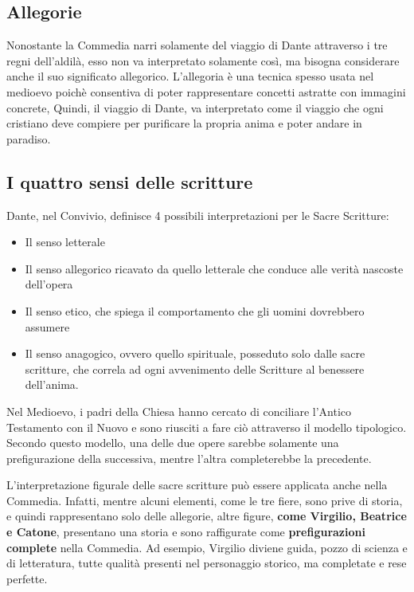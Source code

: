 \documentclass[10pt,a4paper]{article}
\begin{document}
	 \subsection{Allegorie}
	 
	 Nonostante la Commedia narri solamente del viaggio di Dante attraverso i tre regni dell'aldilà, esso non va interpretato solamente così, ma bisogna considerare anche il suo significato allegorico. L'allegoria è una tecnica spesso usata nel medioevo poichè consentiva di poter rappresentare concetti astratte con immagini concrete, Quindi, il viaggio di Dante, va interpretato come il viaggio che ogni cristiano deve compiere per purificare la propria anima e poter andare in paradiso.
	 
	 \subsection{I quattro sensi delle scritture}
	 
	 Dante, nel Convivio, definisce 4 possibili interpretazioni per le Sacre Scritture:
	 \begin{itemize}
	 	\item Il senso letterale
	 	\item Il senso allegorico ricavato da quello letterale che conduce alle verità nascoste dell'opera
	 	\item Il senso etico, che spiega il comportamento che gli uomini dovrebbero assumere
	 	\item Il senso anagogico, ovvero quello spirituale, posseduto solo dalle sacre scritture, che correla ad ogni avvenimento delle Scritture al benessere dell'anima. 
	 \end{itemize}
 
 	Nel Medioevo, i padri della Chiesa hanno cercato di conciliare l'Antico Testamento con il Nuovo e sono riusciti a fare ciò attraverso il modello tipologico. Secondo questo modello, una delle due opere sarebbe solamente una prefigurazione della successiva, mentre l'altra completerebbe la precedente. 
 	
 	L'interpretazione figurale delle sacre scritture può essere applicata anche nella Commedia. Infatti, mentre alcuni elementi, come le tre fiere, sono prive di storia, e quindi rappresentano solo delle allegorie, altre figure, \textbf{come Virgilio, Beatrice e Catone}, presentano una storia e sono raffigurate come \textbf{prefigurazioni complete} nella Commedia. Ad esempio, Virgilio diviene guida, pozzo di scienza e di letteratura, tutte qualità presenti nel personaggio storico, ma completate e rese perfette. 
 	
\end{document}
